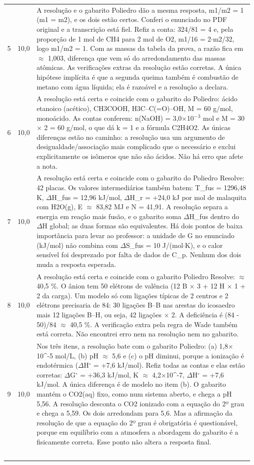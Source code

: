 \documentclass{article}%
\begin{document}
\begin{longtable}{@{}c c p{}@{}}
5 & 10,0 & A resolução e o gabarito Poliedro dão a mesma resposta, m1/m2 = 1 (m1 = m2), e os dois estão certos. Conferi o enunciado no PDF original e a transcrição está fiel. Refiz a conta: 324/81 = 4 e, pela proporção de 1 mol de CH4 para 2 mol de O2, m1/16 = 2$\cdot$m2/32, logo m1/m2 = 1. Com as massas da tabela da prova, a razão fica em $\approx$ 1,003, diferença que vem só do arredondamento das massas atômicas. As verificações extras da resolução estão corretas. A única hipótese implícita é que a segunda queima também é combustão de metano com água líquida; ela é razoável e a resolução a declara. \\
6 & 10,0 & A resolução está certa e coincide com o gabarito do Poliedro: ácido etanoico (acético), CH3COOH, H3C--C(=O)--OH, M = 60 g/mol, monoácido. As contas conferem: n(NaOH) = 3,0$\times$10$^{-}$$^3$ mol e M = 30 $\times$ 2 = 60 g/mol, o que dá k = 1 e a fórmula C2H4O2. As únicas diferenças estão no caminho: a resolução usa um argumento de desigualdade/associação mais complicado que o necessário e exclui explicitamente os isômeros que não são ácidos. Não há erro que afete a nota. \\
7 & 10,0 & A resolução está certa e coincide com o gabarito do Poliedro Resolve: 42 placas. Os valores intermediários também batem: T\_fus = 1296,48 K, $\Delta$H\_fus = 12,96 kJ/mol, $\Delta$H\_r = +24,0 kJ por mol de malaquita com H2O(g), E $\approx$ 83,82 MJ e N = 41,91. A resolução separa a energia em reação mais fusão, e o gabarito soma $\Delta$H\_fus dentro do $\Delta$H global; as duas formas são equivalentes. Há dois pontos de baixa importância para levar ao professor: a unidade de G no enunciado (kJ/mol) não combina com $\Delta$S\_fus = 10 J/(mol$\cdot$K), e o calor sensível foi desprezado por falta de dados de C\_p. Nenhum dos dois muda a resposta esperada. \\
8 & 10,0 & A resolução está certa e coincide com o gabarito Poliedro Resolve: $\approx$ 40,5 \%. O ânion tem 50 elétrons de valência (12 B $\times$ 3 + 12 H $\times$ 1 + 2 da carga). Um modelo só com ligações típicas de 2 centros e 2 elétrons precisaria de 84: 30 ligações B--B nas arestas do icosaedro mais 12 ligações B--H, ou seja, 42 ligações $\times$ 2. A deficiência é (84 - 50)/84 $\approx$ 40,5 \%. A verificação extra pela regra de Wade também está correta. Não encontrei erro nem na resolução nem no gabarito. \\
9 & 10,0 & Nos três itens, a resolução bate com o gabarito Poliedro: (a) 1,8$\times$10\^{}{-}5 mol/L, (b) pH $\approx$ 5,6 e (c) o pH diminui, porque a ionização é endotérmica ($\Delta$H$^\circ$ = +7,6 kJ/mol). Refiz todas as contas e elas estão corretas: $\Delta$G$^\circ$ = +36,3 kJ/mol, K $\approx$ 4,2$\times$10\^{}{-}7, $\Delta$H$^\circ$ = +7,6 kJ/mol. A única diferença é de modelo no item (b). O gabarito mantém o CO2(aq) fixo, como num sistema aberto, e chega a pH 5,56. A resolução desconta o CO2 ionizado com a equação do 2º grau e chega a 5,59. Os dois arredondam para 5,6. Mas a afirmação da resolução de que a equação do 2º grau é obrigatória é questionável, porque em equilíbrio com a atmosfera a abordagem do gabarito é a fisicamente correta. Esse ponto não altera a resposta final. \\
$$
\end{longtable}
\end{document}
